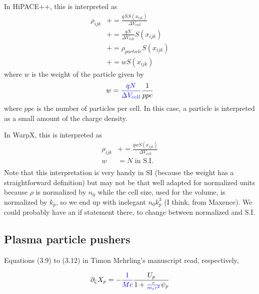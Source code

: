 \documentclass{article}
\begin{document}
In HiPACE++, this is interpreted as
\begin{equation}
\begin{split}
\rho_{ijk} &+= \frac{q N S(x_{ijk})}{\Delta V_{cell}} \\
           &+= \frac{q N}{\Delta V_{cell}} S(x_{ijk}) \\
           &+= \rho_{particle} S(x_{ijk}) \\
           &+= wS(x_{ijk})
\end{split}
\end{equation}
where $w$ is the weight of the particle given by
\begin{equation}
\begin{split}
w &= \textcolor{blue}{\frac{q N}{\Delta V_{cell}}}\frac{1}{ppc} \\
\end{split}
\end{equation}
where $ppc$ is the number of particles per cell. In this case, a particle is interpreted as a small amount of the charge density.

In WarpX, this is interpreted as
\begin{equation}
\begin{split}
\rho_{ijk} &+= \frac{q w S(x_{ijk})}{\Delta V_{cell}} \\
w &= N \text{ in S.I.} \\
\end{split}
\end{equation}
Note that this interpretation is very handy in SI (because the weight has a straightforward definition) but may not be that well adapted for normalized units because $\rho$ is normalized by $n_0$ while the cell size, used for the volume, is normalized by $k_p$, so we end up with inelegant $n_0k_p^3$ (I think, from Maxence). We could probably have an if statement there, to change between normalized and S.I.

\subsection*{Plasma particle pushers}

Equations (3.9) to (3.12) in Timon Mehrling's manuscript read, respectively,

\begin{equation}
\partial_{\zeta}X_p = -\textcolor{blue}{\frac{1}{Mc}}\frac{U_p} {1+\textcolor{blue}{\frac{e}{m_e c^2}}\psi_p }
\end{equation}
\end{document}
